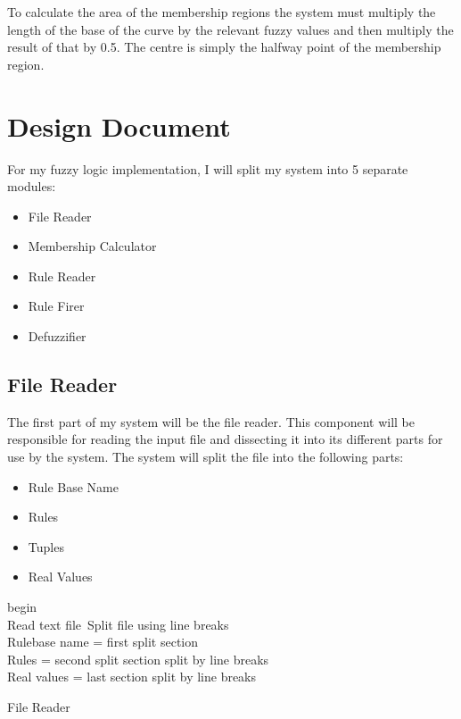 \documentclass{article}
\begin{document}
To calculate the area of the membership regions the system must multiply the length of the base of the curve by the relevant fuzzy values and then multiply the result of that by 0.5. The centre is simply the halfway point of the membership region.

\section{Design Document} 
For my fuzzy logic implementation, I will split my system into 5 separate modules:
\begin{itemize}
  \item File Reader
  \item Membership Calculator
  \item Rule Reader
  \item Rule Firer
  \item Defuzzifier
\end{itemize}

\subsection{File Reader}
The first part of my system will be the file reader. This component will be responsible for reading the input file and dissecting it into its different parts for use by the system. The system will split the file into the following parts:

\begin{itemize}
  \item Rule Base Name
  \item Rules
  \item Tuples
  \item Real Values
\end{itemize}

\begin{algorithm}[H]
\SetAlgoLined
{}
 begin\\
Read text file\
Split file using line breaks\\
Rulebase name = first split section\\
Rules = second split section split by line breaks\\
Real values = last section split by line breaks\\
 \caption{File Reader}
\end{algorithm}
\end{document}
